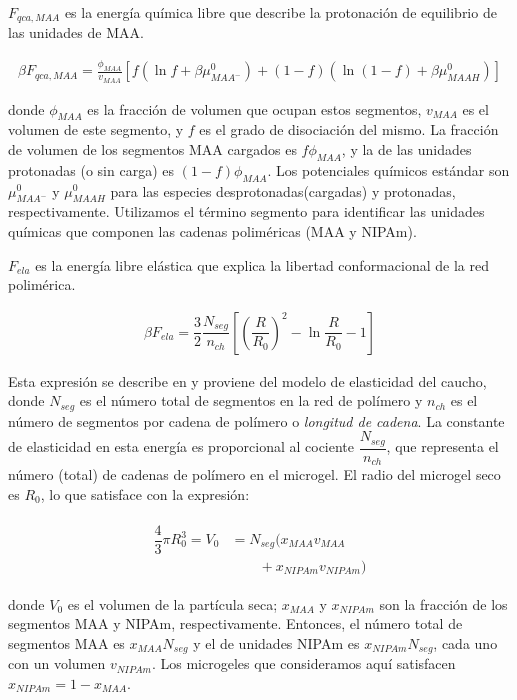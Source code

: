 $F_{qca,MAA}$ es la energ\'ia qu\'imica libre que describe la protonaci\'on de equilibrio de las unidades de MAA.


\begin{align}
	\beta F_{qca, MAA} =  \frac{\phi_{MAA}}{v_{MAA}} \left[f(\ln f+ \beta\mu^0_{MAA^-}) +(1-f)(\ln (1-f)+\beta\mu^0_{MAAH})\right]
\end{align}


\noindent donde $\phi_{MAA}$ es la fracci\'on de volumen que ocupan estos segmentos, $v_{MAA}$ es el volumen de este segmento, y $f$ es el grado de disociaci\'on del mismo. 
La fracci\'on de volumen de los segmentos MAA cargados es $f\phi_{MAA}$, y la de las unidades protonadas (o sin carga) es $(1-f)\phi_{MAA}$.
Los potenciales qu\'imicos est\'andar son $\mu^0_{MAA^-}$ y $\mu^0_{MAAH}$ para las especies desprotonadas(cargadas) y protonadas, respectivamente.
Utilizamos el t\'ermino segmento para identificar las unidades qu\'imicas que componen las cadenas polim\'ericas (MAA y NIPAm).


$F_{ela}$ es la energ\'ia libre el\'astica que explica la libertad conformacional de la red polim\'erica.

\begin{align}
	\beta F_{ela} = \dfrac{3}{2}\dfrac{N_{seg}}{n_{ch} }\left[\left(\dfrac{R}{R_0}\right)^2 - \ln\dfrac{R}{R_0} -1\right]
\end{align}

Esta expresi\'on se describe en \cite{moncho-jorda2016a} y proviene del modelo de elasticidad del caucho,
donde $N_{seg}$ es el n\'umero total de segmentos en la red de pol\'imero y $n_{ch}$ es el n\'umero de segmentos por cadena de pol\'imero o \emph{longitud de cadena}.
La constante de elasticidad en esta energ\'ia es proporcional al cociente $\dfrac{N_{seg}}{n_{ch}}$, que representa el n\'umero (total) de cadenas de pol\'imero en el microgel.
El radio del microgel seco es $R_0$, lo que satisface con la expresi\'on:

%
%
\begin{align}
	\begin{aligned} 
		\dfrac{4}{3}\pi R_0^3=V_0&=N_{seg}\Big( x_{MAA} v_{MAA}\\
		&\qquad+x_{NIPAm} v_{NIPAm}\Big)
	\end{aligned}
\end{align}


\noindent donde $V_0$ es el volumen de la part\'icula seca; $x_{MAA}$ y $x_{NIPAm}$ son la fracci\'on de los segmentos MAA y NIPAm, respectivamente.
Entonces, el n\'umero total de segmentos MAA es $x_{MAA}N_{seg}$ y el de unidades NIPAm es $x_{NIPAm}N_{seg}$, cada uno con un volumen $v_{NIPAm}$.
Los microgeles que consideramos aqu\'i satisfacen $x_{NIPAm}=1-x_{MAA}$.



